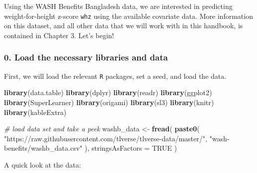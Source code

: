 \documentclass[12pt, krantz2,]{krantz}
\newenvironment{Shaded}{\begin{snugshade}}{\end{snugshade}}
\newcommand{\CommentTok}[1]{\textcolor[rgb]{0.37,0.37,0.37}{\textit{#1}}}
\newcommand{\DataTypeTok}[1]{\textcolor[rgb]{0.27,0.27,0.27}{#1}}
\newcommand{\KeywordTok}[1]{\textcolor[rgb]{0.27,0.27,0.27}{\textbf{#1}}}
\newcommand{\NormalTok}[1]{#1}
\newcommand{\OtherTok}[1]{\textcolor[rgb]{0.37,0.37,0.37}{#1}}
\newcommand{\StringTok}[1]{\textcolor[rgb]{0.5,0.5,0.5}{#1}}
\theoremstyle{definition}
\theoremstyle{definition}
\theoremstyle{definition}
\newcommand{\1}{\mathbbm{1}}
\begin{document}
Using the WASH Benefits Bangladesh data, we are interested in predicting
weight-for-height z-score \texttt{whz} using the available covariate data. More
information on this dataset, and all other data that we will work with in this
handbook, is contained in \protect\hypertarget{data}{}{Chapter 3}. Let's begin!

\hypertarget{load-the-necessary-libraries-and-data}{%
\subsubsection*{0. Load the necessary libraries and data}\label{load-the-necessary-libraries-and-data}}


First, we will load the relevant \texttt{R} packages, set a seed, and load the data.

\begin{Shaded}
\begin{Highlighting}[]
\KeywordTok{library}\NormalTok{(data.table)}
\KeywordTok{library}\NormalTok{(dplyr)}
\KeywordTok{library}\NormalTok{(readr)}
\KeywordTok{library}\NormalTok{(ggplot2)}
\KeywordTok{library}\NormalTok{(SuperLearner)}
\KeywordTok{library}\NormalTok{(origami)}
\KeywordTok{library}\NormalTok{(sl3)}
\KeywordTok{library}\NormalTok{(knitr)}
\KeywordTok{library}\NormalTok{(kableExtra)}

\CommentTok{# load data set and take a peek}
\NormalTok{washb_data <-}\StringTok{ }\KeywordTok{fread}\NormalTok{(}
  \KeywordTok{paste0}\NormalTok{(}
    \StringTok{"https://raw.githubusercontent.com/tlverse/tlverse-data/master/"}\NormalTok{,}
    \StringTok{"wash-benefits/washb_data.csv"}
\NormalTok{  ),}
  \DataTypeTok{stringsAsFactors =} \OtherTok{TRUE}
\NormalTok{)}
\end{Highlighting}
\end{Shaded}

A quick look at the data:
\end{document}
